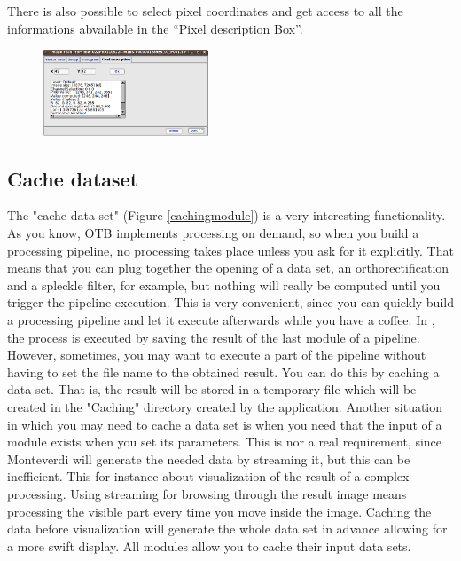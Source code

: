 There is also possible to select pixel coordinates and get access to all the informations abvailable in the ``Pixel description 
Box''.

\begin{figure}
  \center
  \includegraphics[width=0.44\textwidth]{../Art/MonteverdiImages/monteverdi_viewer_pixel_description.png}
  \label{fig:pixeldescriptioninformations}
\end{figure}

\subsection{Cache dataset}
The "cache data set" (Figure \ref{cachingmodule}) is a very interesting functionality. As you know, OTB implements processing on demand, so when you build a 
processing pipeline, no processing takes place unless you ask for it explicitly. That means that you can plug together
the opening of a data set, an orthorectification and a spleckle filter, for example, but nothing will really be computed 
until you trigger the pipeline execution. This is very convenient, since you can quickly build a processing pipeline and 
let it execute afterwards while you have a coffee. In \mont, the process is executed by saving the result of the 
last module of a pipeline. However, sometimes, you may want to execute a part of the pipeline without having to set the 
file name to the obtained result. You can do this by caching a data set. That is, the result will be stored in a temporary 
file which will be created in the "Caching" directory created by the application. Another situation in which you may need 
to cache a data set is when you need that the input of a module exists when you set its parameters. This is nor a real requirement, 
since Monteverdi will generate the needed data by streaming it, but this can be inefficient. This for instance about visualization
of the result of a complex processing. Using streaming for browsing through the result image means processing the visible part 
every time you move inside the image. Caching the data before visualization will generate the whole data set in advance allowing 
for a more swift display. All modules allow you to cache their input data sets.

